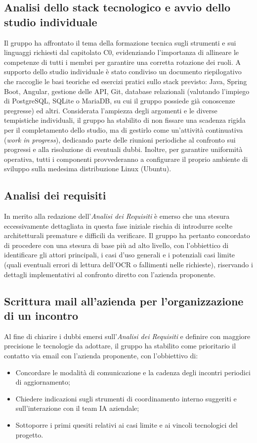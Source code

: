 \documentclass[11pt, a4paper]{article}
\begin{document}
\subsection{Analisi dello stack tecnologico e avvio dello studio individuale}
Il gruppo ha affrontato il tema della formazione tecnica sugli strumenti e sui linguaggi richiesti dal capitolato C0, evidenziando l'importanza di allineare le competenze di tutti i membri per garantire una corretta rotazione dei ruoli.
A supporto dello studio individuale è stato condiviso un documento riepilogativo che raccoglie le basi teoriche ed esercizi pratici sullo stack previsto: Java, Spring Boot, Angular, gestione delle API, Git, database relazionali (valutando l'impiego di PostgreSQL, SQLite o MariaDB, su cui il gruppo possiede già conoscenze pregresse) ed altri.
Considerata l'ampiezza degli argomenti e le diverse tempistiche individuali, il gruppo ha stabilito di non fissare una scadenza rigida per il completamento dello studio, ma di gestirlo come un'attività continuativa (\textit{work in progress}), dedicando parte delle riunioni periodiche al confronto sui progressi e alla risoluzione di eventuali dubbi. Inoltre, per garantire uniformità operativa, tutti i componenti provvederanno a configurare il proprio ambiente di sviluppo sulla medesima distribuzione Linux (Ubuntu).

\subsection{Analisi dei requisiti}
In merito alla redazione dell'\textit{Analisi dei Requisiti} è emerso che una stesura eccessivamente dettagliata in questa fase iniziale rischia di introdurre scelte architetturali premature e difficili da verificare.
Il gruppo ha pertanto concordato di procedere con una stesura di base più ad alto livello, con l'obbiettico di identificare gli attori principali, i casi d'uso generali e i potenziali casi limite (quali eventuali errori di lettura dell'OCR o fallimenti nelle richieste), riservando i dettagli implementativi al confronto diretto con l'azienda proponente.

\subsection{Scrittura mail all'azienda per l'organizzazione di un incontro}
Al fine di chiarire i dubbi emersi sull'\textit{Analisi dei Requisiti} e definire con maggiore precisione le tecnologie da adottare, il gruppo ha stabilito come prioritario il contatto via email con l'azienda proponente, con l'obbiettivo di:
\begin{itemize}
    \item Concordare le modalità di comunicazione e la cadenza degli incontri periodici di aggiornamento;
    \item Chiedere indicazioni sugli strumenti di coordinamento interno suggeriti e sull'interazione con il team IA aziendale;
    \item Sottoporre i primi quesiti relativi ai casi limite e ai vincoli tecnologici del progetto.
\end{itemize}
\end{document}
